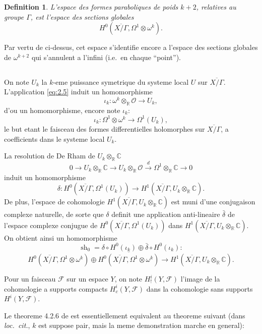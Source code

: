 \documentclass[11pt,reqno]{amsart}
\theoremstyle{plain}
\newtheorem{definition}[theorem]{Definition}
\theoremstyle{remark}
\newcommand{\shF}{\mathcal{F}}
\newcommand{\shO}{\mathcal{O}}
\newcommand{\R}{\mathbb{R}}
\newcommand{\C}{\mathbb{C}}
\numberwithin{equation}{section}
\begin{document}
\begin{definition}\label{def:2.8}
L'espace des formes paraboliques de poids $k+2$, relatives au groupe $\Gamma$, est l'espace des sections globales
\[
H^0(\overline{X/\Gamma}, \Omega^1 \otimes \omega^k).
\]
\end{definition}

Par vertu de ci-dessus, cet espace s'identifie encore a l'espace des sections globales de $\omega^{k+2}$ qui s'annulent a l'infini (i.e.~en chaque ``point'').

\subsection{}\label{subsec:2.9}

On note $U_k$ la $k$-eme puissance symetrique du systeme local $U$ sur $\overline{X/\Gamma}$. L'application \eqref{eq:2.5} induit un homomorphisme
\[
\iota_k: \omega^k \otimes_\R \shO \to U_k,
\]
d'ou un homomorphisme, encore note $\iota_k$:
\[
\iota_k: \Omega^1 \otimes \omega^k \to \Omega^1(U_k),
\]
le but etant le faisceau des formes differentielles holomorphes sur $\overline{X/\Gamma}$, a coefficients dans le systeme local $U_k$.

La resolution de De Rham de $U_k \otimes_\R \C$
\[
0 \to U_k \otimes_\R \C \to U_k \otimes_\R \shO \xrightarrow{d} \Omega^1 \otimes_\R \C \to 0
\]
induit un homomorphisme
\[
\delta: H^0(\overline{X/\Gamma}, \Omega^1(U_k)) \to H^1(\overline{X/\Gamma}, U_k \otimes_\R \C).
\]
De plus, l'espace de cohomologie $H^1(\overline{X/\Gamma}, U_k \otimes_\R \C)$ est muni d'une conjugaison complexe naturelle, de sorte que $\delta$ definit une application anti-lineaire $\bar{\delta}$ de l'espace complexe conjugue de $H^0(\overline{X/\Gamma}, \Omega^1(U_k))$ dans $H^1(\overline{X/\Gamma}, U_k \otimes_\R \C)$. On obtient ainsi un homomorphisme
\[
\operatorname{sh}_0 = \delta \circ H^0(\iota_k) \oplus \bar{\delta} \circ H^0(\iota_k):
\]
\[
H^0(\overline{X/\Gamma}, \Omega^1 \otimes \omega^k) \oplus \overline{H^0(\overline{X/\Gamma}, \Omega^1 \otimes \omega^k)} \longrightarrow H^1(\overline{X/\Gamma}, U_k \otimes_\R \C).
\]

Pour un faisceau $\shF$ sur un espace $Y$, on note $H^i_!(Y, \shF)$ l'image de la cohomologie a supports compacts $H^i_c(Y, \shF)$ dans la cohomologie sans supports $H^i(Y, \shF)$.

Le theoreme 4.2.6 de \cite{Verdier} est essentiellement equivalent au theoreme suivant (dans \emph{loc.~cit.}, $k$ est suppose pair, mais la meme demonstration marche en general):
\end{document}
